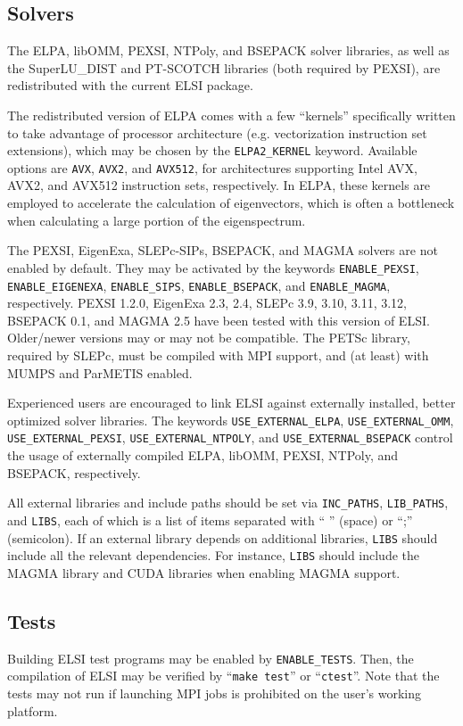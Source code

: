 \documentclass{report}
\begin{document}
\subsection{Solvers}
\label{subsec:config_solvers}
The ELPA, libOMM, PEXSI, NTPoly, and BSEPACK solver libraries, as well as the SuperLU\_DIST and PT-SCOTCH libraries (both required by PEXSI), are redistributed with the current ELSI package.

The redistributed version of ELPA comes with a few ``kernels'' specifically written to take advantage of processor architecture (e.g. vectorization instruction set extensions), which may be chosen by the \texttt{ELPA2\_KERNEL} keyword. Available options are \texttt{AVX}, \texttt{AVX2}, and \texttt{AVX512}, for architectures supporting Intel AVX, AVX2, and AVX512 instruction sets, respectively. In ELPA, these kernels are employed to accelerate the calculation of eigenvectors, which is often a bottleneck when calculating a large portion of the eigenspectrum.

The PEXSI, EigenExa, SLEPc-SIPs, BSEPACK, and MAGMA solvers are not enabled by default. They may be activated by the keywords \texttt{ENABLE\_PEXSI}, \texttt{ENABLE\_EIGENEXA}, \texttt{ENABLE\_SIPS}, \texttt{ENABLE\_BSEPACK}, and \texttt{ENABLE\_MAGMA}, respectively. PEXSI 1.2.0, EigenExa 2.3, 2.4, SLEPc 3.9, 3.10, 3.11, 3.12, BSEPACK 0.1, and MAGMA 2.5 have been tested with this version of ELSI. Older/newer versions may or may not be compatible. The PETSc library, required by SLEPc, must be compiled with MPI support, and (at least) with MUMPS and ParMETIS enabled.

Experienced users are encouraged to link ELSI against externally installed, better optimized solver libraries. The keywords \texttt{USE\_EXTERNAL\_ELPA}, \texttt{USE\_EXTERNAL\_OMM}, \texttt{USE\_EXTERNAL\_PEXSI}, \texttt{USE\_EXTERNAL\_NTPOLY}, and \texttt{USE\_EXTERNAL\_BSEPACK} control the usage of externally compiled ELPA, libOMM, PEXSI, NTPoly, and BSEPACK, respectively.

All external libraries and include paths should be set via \texttt{INC\_PATHS}, \texttt{LIB\_PATHS}, and \texttt{LIBS}, each of which is a list of items separated with `` '' (space) or ``;'' (semicolon). If an external library depends on additional libraries, \texttt{LIBS} should include all the relevant dependencies. For instance, \texttt{LIBS} should include the MAGMA library and CUDA libraries when enabling MAGMA support.

\subsection{Tests}
\label{subsec:config_tests}
Building ELSI test programs may be enabled by \texttt{ENABLE\_TESTS}. Then, the compilation of ELSI may be verified by ``\texttt{make test}'' or ``\texttt{ctest}''. Note that the tests may not run if launching MPI jobs is prohibited on the user's working platform.
\end{document}

